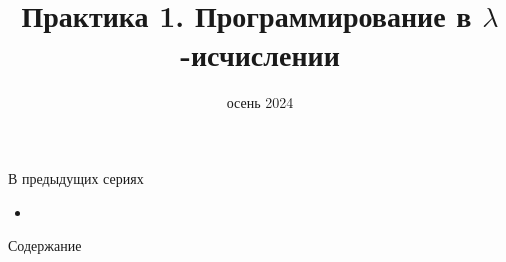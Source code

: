 
\newif\ifhandout




\title[Программирование в $\lambda$-исчислении]{Практика 1. Программирование в $\lambda$-исчислении}
\date{осень 2024}



    \setcounter{framenumber}{-1}
    \maketitle

    \begin{frame}{В предыдущих сериях}
        \begin{itemize}
            \item
        \end{itemize}
    \end{frame}

    \begin{frame}[noframenumbering]{Содержание}
        \tableofcontents
    \end{frame}


